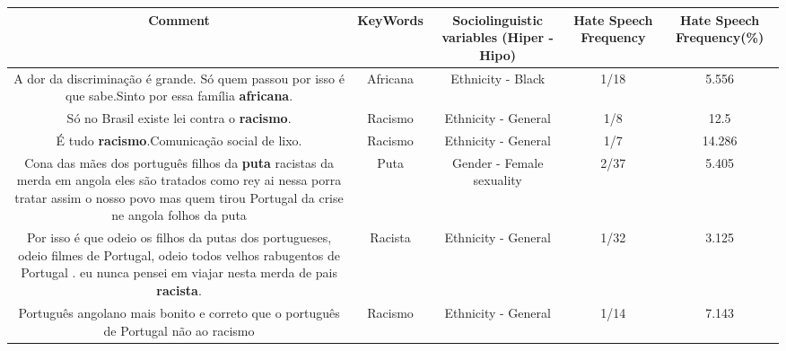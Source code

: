 \documentclass[11pt]{article}
\newlength\mylength
\begin{document}
\begin{center}
\setlength\mylength{\dimexpr\textwidth - 1\arrayrulewidth - 50\tabcolsep}
\begin{longtable}{|C{.65\mylength}|C{.30\mylength}|C{.12\mylength}|C{.12\mylength}|C{.12\mylength}|}
\hline
\textbf{Comment} & \textbf{KeyWords} & \textbf{Sociolinguistic variables (Hiper - Hipo)}  & \textbf{Hate Speech Frequency} & \textbf{Hate Speech Frequency(\%)} \\
\hline{}\small A dor da discriminação é grande. Só quem passou por isso é que sabe.Sinto por essa família \textbf{africana}.\normalsize   & Africana & Ethnicity - Black & 1/18 & 5.556 \\  \hline
  \small Só no Brasil existe lei contra o \textbf{racismo}.\normalsize   & Racismo & Ethnicity - General & 1/8 & 12.5 \\  \hline
  \small É tudo \textbf{racismo}.Comunicação social de lixo.\normalsize   & Racismo & Ethnicity - General & 1/7 & 14.286 \\  \hline
  \small Cona das mães dos português filhos da \textbf{puta} racistas da merda em angola eles são tratados como rey ai nessa porra tratar assim o nosso povo mas quem tirou Portugal da crise ne angola folhos da puta\normalsize   & Puta & Gender - Female sexuality & 2/37 & 5.405 \\  \hline
  \small Por isso é que odeio os filhos da putas dos portugueses, odeio filmes de Portugal, odeio todos velhos rabugentos de Portugal . eu nunca pensei em viajar nesta merda de pais \textbf{racista}.\normalsize   & Racista & Ethnicity - General & 1/32 & 3.125 \\  \hline
  \small Português angolano mais bonito e correto que o português de Portugal não ao racismo\normalsize   & Racismo & Ethnicity - General & 1/14 & 7.143 \\  \hline

\end{longtable}
\end{center}
\end{document}
